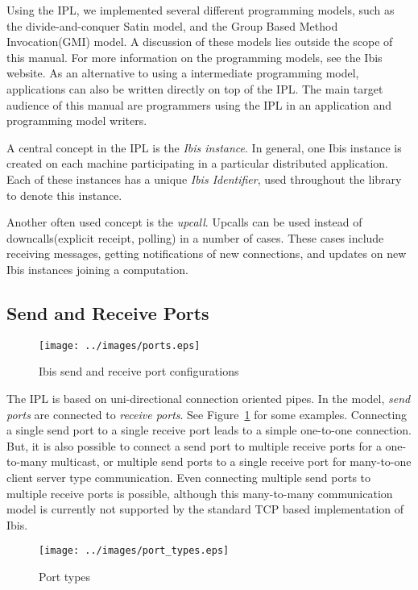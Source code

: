 \documentclass[10pt]{article}
\begin{document}
Using the IPL, we implemented several different programming models, such
as the divide-and-conquer Satin model, and the Group Based Method
Invocation(GMI) model. A discussion of these models lies outside the
scope of this manual. For more information on the programming models,
see the Ibis website. As an alternative to using a intermediate
programming model, applications can also be written directly on top of
the IPL. The main target audience of this manual are programmers using
the IPL in an application and programming model writers.

A central concept in the IPL is the \emph{Ibis instance}. In general,
one Ibis instance is created on each machine participating in a
particular distributed application. Each of these instances has a unique
\emph{Ibis Identifier}, used throughout the library to denote this
instance.

Another often used concept is the \emph{upcall}. Upcalls can be used
instead of downcalls(explicit receipt, polling) in a number of cases.
These cases include receiving messages, getting notifications of new
connections, and updates on new Ibis instances joining a computation.

\subsection{Send and Receive Ports}


\begin{figure} \centering
\texttt{[image: ../images/ports.eps]}
\caption{Ibis send and receive port configurations} \label{ports}
\end{figure}

The IPL is based on uni-directional connection oriented pipes. In the
model, \emph{send ports} are connected to \emph{receive ports}. See
Figure~\ref{ports} for some examples. Connecting a single send port to a
single receive port leads to a simple one-to-one connection. But, it is
also possible to connect a send port to multiple receive ports for a
one-to-many multicast, or multiple send ports to a single receive port
for many-to-one client server type communication. Even connecting
multiple send ports to multiple receive ports is possible, although this
many-to-many communication model is currently not supported by the
standard TCP based implementation of Ibis.

\begin{figure} \centering
\texttt{[image: ../images/port\_types.eps]}
\caption{Port types} \label{port_types}
\end{figure}
\end{document}

